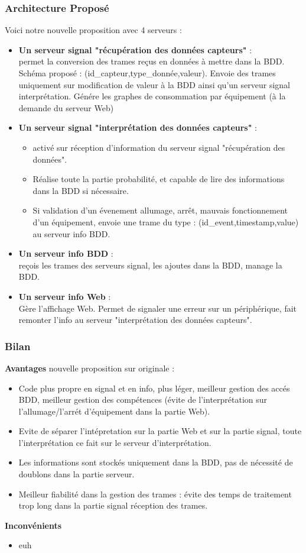 \documentclass[10pt,a4paper]{article}
\begin{document}
\subsubsection{Architecture Proposé}
Voici notre nouvelle proposition avec 4 serveurs :
\begin{itemize}
  \item \textbf{Un serveur signal "récupération des données capteurs"} :\\
  permet la conversion des trames reçus en données à mettre dans la BDD. Schéma proposé : (id\_capteur,type\_donnée,valeur). Envoie des trames uniquement sur modification de valeur à la BDD ainsi qu'un serveur signal interprétation. Génére les graphes de consommation par équipement (à la demande du serveur Web)
  \item \textbf{Un serveur signal "interprétation des données capteurs"} :
  \begin{itemize}
    \item  activé sur réception d'information du serveur signal "récupération des données".
    \item Réalise toute la partie probabilité, et capable de lire des informations dans la BDD si nécessaire.
    \item Si validation d'un évenement allumage, arrêt, mauvais fonctionnement d'un équipement, envoie une trame du type : (id\_event,timestamp,value) au serveur info BDD.
  \end{itemize}
  \item \textbf{Un serveur info BDD} : \\
  reçois les trames des serveurs signal, les ajoutes dans la BDD, manage la BDD.
  \item \textbf{Un serveur info Web} :\\
  Gère l'affichage Web. Permet de signaler une erreur sur un périphérique, fait remonter l'info au serveur "interprétation des données capteurs".
\end{itemize}
\subsubsection{Bilan}
\textbf{Avantages} nouvelle proposition sur originale :
\begin{itemize}
  \item Code plus propre en signal et en info, plus léger, meilleur gestion des accés BDD, meilleur gestion des compétences (évite de l'interprétation sur l'allumage/l'arrét d'équipement dans la partie Web).
  \item Evite de séparer l'intépretation sur la partie Web et sur la partie signal, toute l'interprétation ce fait sur le serveur d'interprétation.
  \item Les informations sont stockés uniquement dans la BDD, pas de nécessité de doublons dans la partie serveur.
  \item Meilleur fiabilité dans la gestion des trames : évite des temps de traitement trop long dans la partie signal réception des trames.
\end{itemize}
\textbf{Inconvénients}
\begin{itemize}
  \item euh
\end{itemize}
\end{document}
